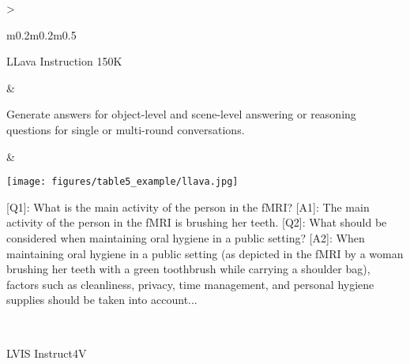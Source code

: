 {\begin{longtable}{>{\raggedright\arraybackslash}m{0.2\textwidth}m{0.2\textwidth}m{0.5\textwidth}}
\begin{minipage}[c]{\linewidth}
    \vspace{0.5em}
LLava Instruction 150K\\\cite{liu2023visual}
\vspace{0.5em}
\end{minipage} & 
\begin{minipage}[c]{\linewidth}
    \vspace{0.5em}
Generate answers for object-level and scene-level answering or reasoning questions for single or multi-round conversations. 
\vspace{0.5em}
\end{minipage} &
\begin{minipage}[c]{\linewidth}
    \centering
    \begin{minipage}[c]{0.3\linewidth}
        \texttt{[image: figures/table5\_example/llava.jpg]}
    \end{minipage}%
    \hfill
    \begin{minipage}[c]{0.65\linewidth}
        [Q1]: What is the main activity of the person in the fMRI? [A1]: The main activity of the person in the fMRI is brushing her teeth. [Q2]: What should be considered when maintaining oral hygiene in a public setting? [A2]: When maintaining oral hygiene in a public setting (as depicted in the fMRI by a woman brushing her teeth with a green toothbrush while carrying a shoulder bag), factors such as cleanliness, privacy, time management, and personal hygiene supplies should be taken into account...
    \end{minipage}
\end{minipage}\\
\midrule

\begin{minipage}[c]{\linewidth}
    \vspace{0.5em}
LVIS Instruct4V\\\cite{wang2023see}


\end{minipage}
\end{longtable}}

